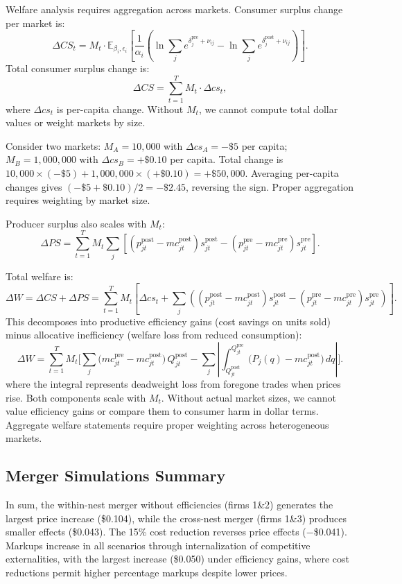 \documentclass[english,11pt]{article}
\begin{document}
\begin{enumerate}
Welfare analysis requires aggregation across markets. Consumer surplus change per market is:
\[
\Delta CS_t = M_t \cdot \mathbb{E}_{\beta_i, \epsilon_i} \left[\frac{1}{\alpha_i} \left(\ln \sum_j e^{\delta_j^{\text{pre}} + \nu_{ij}} - \ln \sum_j e^{\delta_j^{\text{post}} + \nu_{ij}}\right)\right].
\]
Total consumer surplus change is:
\[
\Delta CS = \sum_{t=1}^{T} M_t \cdot \Delta cs_t,
\]
where $\Delta cs_t$ is per-capita change. Without $M_t$, we cannot compute total dollar values or weight markets by size.

Consider two markets: $M_A = 10{,}000$ with $\Delta cs_A = -\$5$ per capita; $M_B = 1{,}000{,}000$ with $\Delta cs_B = +\$0.10$ per capita. Total change is $10{,}000 \times (-\$5) + 1{,}000{,}000 \times (+\$0.10) = +\$50{,}000$. Averaging per-capita changes gives $(-\$5 + \$0.10)/2 = -\$2.45$, reversing the sign. Proper aggregation requires weighting by market size.

Producer surplus also scales with $M_t$:
\[
\Delta PS = \sum_{t=1}^{T} M_t \sum_{j} \left[(p_{jt}^{\text{post}} - mc_{jt}^{\text{post}}) s_{jt}^{\text{post}} - (p_{jt}^{\text{pre}} - mc_{jt}^{\text{pre}}) s_{jt}^{\text{pre}}\right].
\]

Total welfare is:
\[
\Delta W = \Delta CS + \Delta PS = \sum_{t=1}^{T} M_t \left[\Delta cs_t + \sum_{j} \left((p_{jt}^{\text{post}} - mc_{jt}^{\text{post}}) s_{jt}^{\text{post}} - (p_{jt}^{\text{pre}} - mc_{jt}^{\text{pre}}) s_{jt}^{\text{pre}}\right)\right].
\]
This decomposes into productive efficiency gains (cost savings on units sold) minus allocative inefficiency (welfare loss from reduced consumption):
\[
\Delta W = \sum_{t=1}^{T} M_t \Bigg[ 
\sum_j \big( mc_{jt}^{\text{pre}} - mc_{jt}^{\text{post}} \big) \, Q_{jt}^{\text{post}} 
- \sum_j \left| \int_{Q_{jt}^{\text{post}}}^{Q_{jt}^{\text{pre}}} \big( P_j(q) - mc_{jt}^{\text{post}} \big) \, dq \right|
\Bigg].
\]
where the integral represents deadweight loss from foregone trades when prices rise. Both components scale with $M_t$. Without actual market sizes, we cannot value efficiency gains or compare them to consumer harm in dollar terms. Aggregate welfare statements require proper weighting across heterogeneous markets.


\subsection*{Merger Simulations Summary}

\noindent In sum, the within-nest merger without efficiencies (firms 1\&2) generates the largest price increase (\$0.104), while the cross-nest merger (firms 1\&3) produces smaller effects (\$0.043). The 15\% cost reduction reverses price effects ($-$\$0.041). Markups increase in all scenarios through internalization of competitive externalities, with the largest increase (\$0.050) under efficiency gains, where cost reductions permit higher percentage markups despite lower prices.


\end{enumerate}
\end{document}
